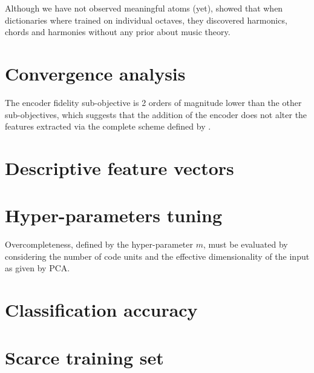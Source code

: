 Although we have not observed meaningful atoms (yet), \cite{lecun2010PSD} showed that when dictionaries where trained on individual octaves, they discovered harmonics, chords and harmonies without any prior about music theory.

\section{Convergence analysis}

The encoder fidelity sub-objective is 2 orders of magnitude lower than the other sub-objectives, which suggests that the addition of the encoder does not alter the features extracted via the complete scheme defined by .

\section{Descriptive feature vectors}

\section{Hyper-parameters tuning}

Overcompleteness, defined by the hyper-parameter $m$, must be evaluated by considering the number of code units and the effective dimensionality of the input as given by \gls{PCA}.

\section{Classification accuracy}


\section{Scarce training set}

